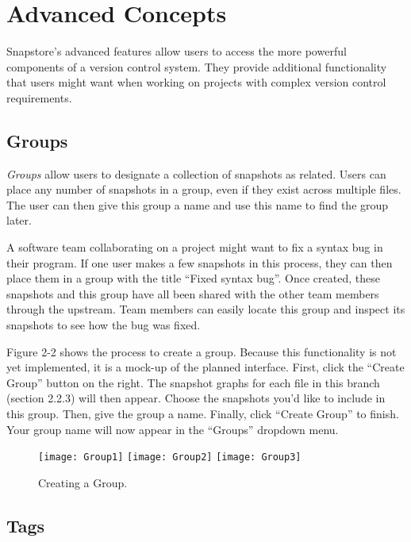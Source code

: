 \section{Advanced Concepts}

Snapstore's advanced features allow users to access the more powerful components of a version control system. They provide additional functionality that users might want when working on projects with complex version control requirements.

\subsection{Groups}

\textit{Groups} allow users to designate a collection of snapshots as related. Users can place any number of snapshots in a group, even if they exist across multiple files. The user can then give this group a name and use this name to find the group later.

A software team collaborating on a project might want to fix a syntax bug in their program. If one user makes a few snapshots in this process, they can then place them in a group with the title ``Fixed syntax bug''. Once created, these snapshots and this group have all been shared with the other team members through the upstream. Team members can easily locate this group and inspect its snapshots to see how the bug was fixed. 

Figure 2-2 shows the process to create a group. Because this functionality is not yet implemented, it is a mock-up of the planned interface. First, click the ``Create Group'' button on the right. The snapshot graphs for each file in this branch (section 2.2.3) will then appear. Choose the snapshots you'd like to include in this group. Then, give the group a name. Finally, click ``Create Group'' to finish. Your group name will now appear in the ``Groups'' dropdown menu.

\begin{figure}
\begin{center}
\texttt{[image: Group1]}
\texttt{[image: Group2]}
\texttt{[image: Group3]}
\end{center}
\caption{Creating a Group.}
\label{arm:fig1}
\end{figure}

\subsection{Tags}

